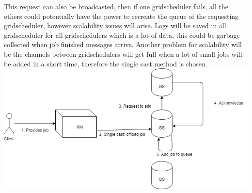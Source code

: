 \documentclass[a4paper]{article}
\begin{document}
This request can also be broadcasted, then if one gridscheduler fails, all the others could potentially have the power to recreate the queue of the requesting gridscheduler, however scalability issues will arise.
Logs will be saved in all gridscheduler for all gridschedulers which is a lot of data, this could be garbage collected when job finished messages arrive.
Another problem for scalability will be the channels between gridschedulers will get full when a lot of small jobs will be added in a short time, therefore the single cast method is chosen. \\

\includegraphics[scale=0.5]{design-rm-offload-job.png}
\end{document}
